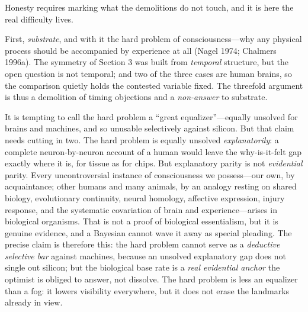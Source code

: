 \documentclass[11pt]{article}
\begin{document}
Honesty requires marking what the demolitions do not touch, and it is here the real difficulty lives.

First, \emph{substrate}, and with it the hard problem of consciousness---why any physical process should be accompanied by experience at all (Nagel 1974; Chalmers 1996a). The symmetry of Section 3 was built from \emph{temporal} structure, but the open question is not temporal; and two of the three cases are human brains, so the comparison quietly holds the contested variable fixed. The threefold argument is thus a demolition of timing objections and a \emph{non-answer} to substrate.

It is tempting to call the hard problem a ``great equalizer''---equally unsolved for brains and machines, and so unusable selectively against silicon. But that claim needs cutting in two. The hard problem is equally unsolved \emph{explanatorily}: a complete neuron-by-neuron account of a human would leave the why-is-it-felt gap exactly where it is, for tissue as for chips. But explanatory parity is not \emph{evidential} parity. Every uncontroversial instance of consciousness we possess---our own, by acquaintance; other humans and many animals, by an analogy resting on shared biology, evolutionary continuity, neural homology, affective expression, injury response, and the systematic covariation of brain and experience---arises in biological organisms. That is not a proof of biological essentialism, but it is genuine evidence, and a Bayesian cannot wave it away as special pleading. The precise claim is therefore this: the hard problem cannot serve as a \emph{deductive selective bar} against machines, because an unsolved explanatory gap does not single out silicon; but the biological base rate is a \emph{real evidential anchor} the optimist is obliged to answer, not dissolve. The hard problem is less an equalizer than a fog: it lowers visibility everywhere, but it does not erase the landmarks already in view.
\end{document}
